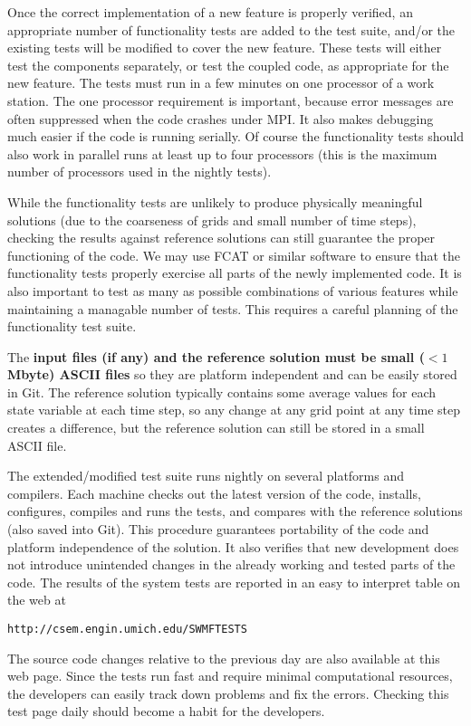 \documentclass{article}
\begin{document}
Once the correct implementation of a new feature is properly verified,
an appropriate number of functionality tests are added to the test suite,
and/or the existing tests will be modified to cover the new feature.
These tests will either test the components separately, or test the coupled
code, as appropriate for the new feature.
The tests must run in a few minutes on one processor of a work station. 
The one processor requirement is important, because error messages are
often suppressed when the code crashes under MPI. It also makes 
debugging much easier if the code is running serially. Of course the
functionality tests should also work in parallel runs at least up to
four processors (this is the maximum number of processors used in the
nightly tests).

While the functionality tests are unlikely to produce physically 
meaningful solutions (due to the coarseness of grids and small number 
of time steps), checking the results against reference solutions 
can still guarantee the proper functioning of the code. 
We may use FCAT or similar software to ensure that
the functionality tests properly exercise all parts of the newly implemented
code. It is also important to test as many as possible combinations of 
various features while maintaining a managable number of tests. 
This requires a careful planning of the functionality test suite.

The {\bf input files (if any) and the reference solution must be small 
($<1$ Mbyte) ASCII files} so they are platform independent and can be 
easily stored in Git.
The reference solution typically contains some average values for each
state variable at each time step, so any change at any grid point at
any time step creates a difference, but the reference solution can 
still be stored in a small ASCII file.

The extended/modified test suite runs nightly on several platforms and 
compilers. Each machine checks out the latest version of the code, 
installs, configures, compiles and runs the tests, and compares with
the reference solutions (also saved into Git).
This procedure guarantees portability of the code and 
platform independence of the solution. It also verifies
that new development does not introduce unintended changes in the 
already working and tested parts of the code.
The results of the system tests are reported in an easy to interpret
table on the web at
\begin{verbatim}
http://csem.engin.umich.edu/SWMFTESTS
\end{verbatim}
The source code changes relative to the previous day are 
also available at this web page.
Since the tests run fast and require minimal computational resources,
the developers can easily track down problems and fix the errors.
Checking this test page daily should become a habit for the developers.
\end{document}
